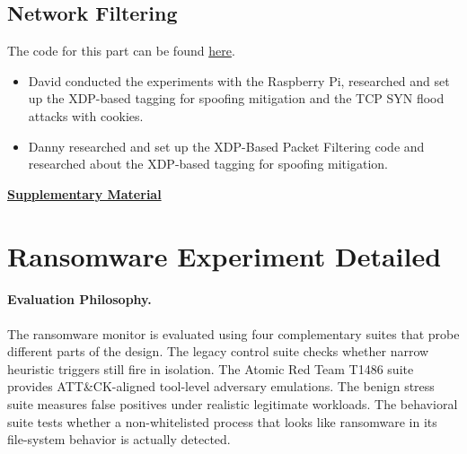 \documentclass[twocolumn, 10pt]{scrartcl}
\begin{document}
\subsection{Network Filtering}
The code for this part can be found \href{https://github.com/davidbockelman/cs380-network-filters}{here}.
\begin{itemize}
    \item{David conducted the experiments with the Raspberry Pi, researched and set up the XDP-based tagging for spoofing mitigation and the TCP SYN flood attacks with cookies.}
    \item{Danny researched and set up the XDP-Based Packet Filtering code and researched about the XDP-based tagging for spoofing mitigation.}
\end{itemize}  




\clearpage
\appendix
{\Large\begin{center}\underline{\textbf{Supplementary Material}}\end{center}}

\section{Ransomware Experiment Detailed}
\label{app:testsuites}
\paragraph{Evaluation Philosophy.}
The ransomware monitor is evaluated using four complementary suites that probe different parts of the design. The legacy control suite checks whether narrow heuristic triggers still fire in isolation. The Atomic Red Team T1486 suite provides ATT\&CK-aligned tool-level adversary emulations. The benign stress suite measures false positives under realistic legitimate workloads. The behavioral suite tests whether a non-whitelisted process that looks like ransomware in its file-system behavior is actually detected.
\end{document}
